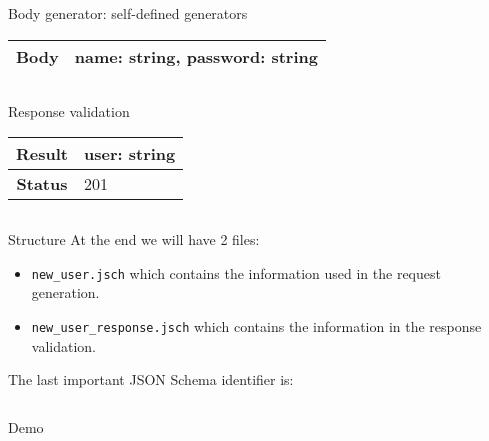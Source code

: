\begin{frame}{Body generator: self-defined generators}
  \centering
  \begin{tabular}{| c | l |}
    \hline
    \textbf{Body} & name: string, password: string \\ \hline
  \end{tabular}
  \centering
  \inputminted{js}{./code/example1_body_custom_generators.jsch}
\end{frame}

\begin{frame}{Response validation}
  \centering
  \begin{tabular}{| c | l |}
    \hline
    \textbf{Result}    & user: string \\ \hline
    \textbf{Status}    & 201 \\ \hline
  \end{tabular}
  \centering
  \inputminted{js}{./code/example1_new_user_response.jsch}
\end{frame}

\begin{frame}{Structure}
  At the end we will have 2 files:
  \begin{itemize}
  \item \texttt{new\_user.jsch} which contains the information used in
    the request generation.
  \item \texttt{new\_user\_response.jsch} which contains the information
    in the response validation.
  \end{itemize}
  The last important JSON Schema identifier is:
  \inputminted{js}{./code/example1_targetSchema.jsch}
\end{frame}

\begin{frame}[standout]
  Demo
\end{frame}